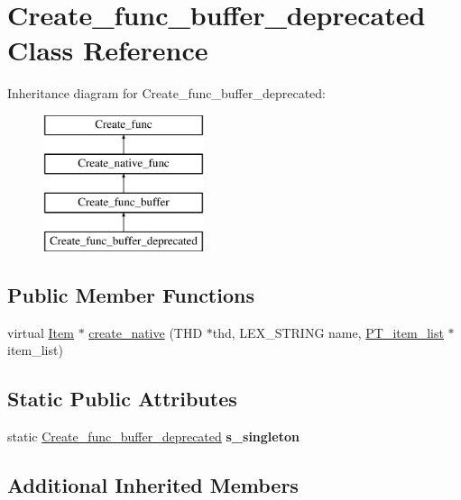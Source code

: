 \hypertarget{classCreate__func__buffer__deprecated}{}\section{Create\+\_\+func\+\_\+buffer\+\_\+deprecated Class Reference}
\label{classCreate__func__buffer__deprecated}
Inheritance diagram for Create\+\_\+func\+\_\+buffer\+\_\+deprecated\+:\begin{figure}[H]
\begin{center}
\leavevmode
\includegraphics[height=4.000000cm]{classCreate__func__buffer__deprecated}
\end{center}
\end{figure}
\subsection*{Public Member Functions}
\begin{DoxyCompactItemize}
\item 
virtual \mbox{\hyperlink{classItem}{Item}} $\ast$ \mbox{\hyperlink{classCreate__func__buffer__deprecated_a87f697ca068455b16f4f9b73cb31c499}{create\+\_\+native}} (T\+HD $\ast$thd, L\+E\+X\+\_\+\+S\+T\+R\+I\+NG name, \mbox{\hyperlink{classPT__item__list}{P\+T\+\_\+item\+\_\+list}} $\ast$item\+\_\+list)
\end{DoxyCompactItemize}
\subsection*{Static Public Attributes}
\begin{DoxyCompactItemize}
\item 
\mbox{\label{classCreate__func__buffer__deprecated_a54de6e6c04082c981c89a72b6aebd433}} 
static \mbox{\hyperlink{classCreate__func__buffer__deprecated}{Create\+\_\+func\+\_\+buffer\+\_\+deprecated}} {\bfseries s\+\_\+singleton}
\end{DoxyCompactItemize}
\subsection*{Additional Inherited Members}


